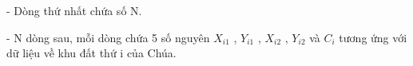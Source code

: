 - Dòng thứ nhất chứa số N.


- N dòng sau, mỗi dòng chứa 5 số nguyên $X_{i1}$ , $Y_{i1}$ , $X_{i2}$ , $Y_{i2}$ và $C_{i}$ tương ứng với dữ liệu về khu đất thứ i của Chúa.